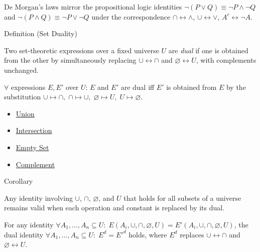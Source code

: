 \begin{remark*}
De Morgan's laws mirror the propositional logic identities $\neg(P \lor Q) \equiv \neg P \land \neg Q$ and $\neg(P \land Q) \equiv \neg P \lor \neg Q$ under the correspondence $\cap \leftrightarrow \land$, $\cup \leftrightarrow \lor$, $A^c \leftrightarrow \neg A$.
\end{remark*}

\begin{definitionbox}{Definition (Set Duality)}
\begin{definition}\label{def:set-duality}
Two set-theoretic expressions over a fixed universe $U$ are \emph{dual} if one
is obtained from the other by simultaneously replacing
$\cup \leftrightarrow \cap$ and $\varnothing \leftrightarrow U$, with
complements unchanged.
\end{definition}
\end{definitionbox}

\begin{remark*}
$\forall$ expressions $E, E'$ over $U$: $E$ and $E'$ are dual iff $E'$ is obtained from $E$ by the substitution $\cup \mapsto \cap,\; \cap \mapsto \cup,\; \varnothing \mapsto U,\; U \mapsto \varnothing$.
\end{remark*}

\begin{dependencies}
\begin{itemize}
  \item \hyperref[def:union]{Union}
  \item \hyperref[def:intersection]{Intersection}
  \item \hyperref[def:empty-set]{Empty Set}
  \item \hyperref[def:complement]{Complement}
\end{itemize}
\end{dependencies}

\begin{corollarybox}{Corollary}
\begin{corollary}\label{cor:set-duality}
Any identity involving $\cup$, $\cap$, $\varnothing$, and $U$ that holds for
all subsets of a universe remains valid when each operation and constant is
replaced by its dual.
\end{corollary}
\end{corollarybox}

\begin{remark*}
For any identity $\forall A_1,\dots,A_n \subseteq U:\; E(A_i,\cup,\cap,\varnothing,U) = E'(A_i,\cup,\cap,\varnothing,U)$, the dual identity $\forall A_1,\dots,A_n \subseteq U:\; E^d = E'^d$ holds, where $E^d$ replaces $\cup\leftrightarrow\cap$ and $\varnothing\leftrightarrow U$.
\end{remark*}

